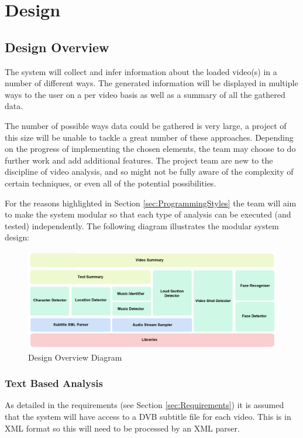 \section{Design}

\subsection{Design Overview}
\label{sec:DesignOverview}

The system will collect and infer information about the loaded video(s) in a number of different ways. The generated information will be 
displayed in multiple ways to the user on a per video basis as well as a summary of all the gathered data.

The number of possible ways data could be gathered is very large, a project of this size will be unable to tackle a great number of these approaches. Depending on the progress of implementing the chosen elements, the team may choose to do further work and add additional features. The project team are new to the discipline of video analysis, and so might not be fully aware of the complexity of certain techniques, or even all of the potential possibilities. 

For the reasons highlighted in Section \ref{sec:ProgrammingStyles} the team will aim to make the system modular so that each type of analysis can be executed (and tested) 
independently. The following diagram illustrates the modular system design:

\begin{figure}[h1]
\includegraphics[trim = 0mm 0mm 0mm 0mm, clip, scale=0.27]{Images/design_overview_diagram.jpg}
\caption{Design Overview Diagram}
\label{fig:DesignOverview}
\end{figure}

\subsubsection{Text Based Analysis}
As detailed in the requirements (see Section \ref{sec:Requirements}) it is assumed that the system will have access to a DVB subtitle file for each video. This is in XML format so this will need to be processed by an XML parser. 

